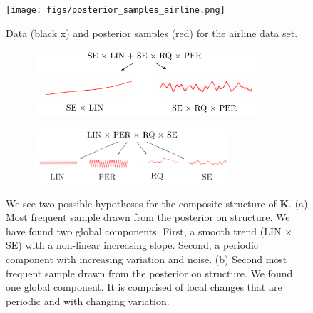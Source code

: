 \begin{figure}
\texttt{[image: figs/posterior\_samples\_airline.png]}
\caption{Data (black x) and posterior samples (red) for the airline data set.}
\end{figure}


\begin{figure}
        \centering
        \begin{subfigure}{0.49\textwidth} \centering
                \includegraphics[width=0.9\textwidth]{figs/airline_struct_1.pdf}
        \end{subfigure}
	\begin{subfigure}{0.49\textwidth} \centering
                \includegraphics[width=0.8\textwidth]{figs/airline_struct_2.pdf}
        \end{subfigure}
        \caption{We see two possible hypotheses for the composite structure of $\mathbf{K}$. (a) Most frequent sample drawn from the posterior on structure. We have found two global components. First, a smooth trend (LIN $\times$ SE) with a non-linear increasing slope. Second, a periodic component with increasing variation and noise. (b) Second most frequent sample drawn from the posterior on structure. We found one global component. It is comprised of local changes that are periodic and with changing variation.}\label{fig:posterior_twosamples}
\end{figure}